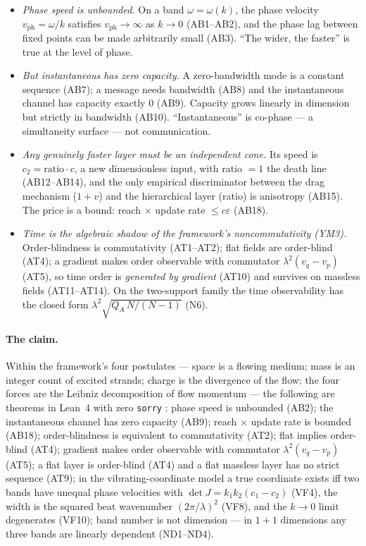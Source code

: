 \documentclass[aps,prd,preprint,superscriptaddress,amsmath,amssymb]{revtex4-2}
\begin{document}
\begin{itemize}
\item \emph{Phase speed is unbounded.}  On a band
$\omega=\omega(k)$, the phase velocity $v_{\mathrm{ph}}=\omega/k$
satisfies $v_{\mathrm{ph}}\to\infty$ as $k\to0$ (AB1--AB2), and the
phase lag between fixed points can be made arbitrarily small (AB3).
``The wider, the faster'' is true at the level of phase.
\item \emph{But instantaneous has zero capacity.}  A zero-bandwidth
mode is a constant sequence (AB7); a message needs bandwidth (AB8) and
the instantaneous channel has capacity exactly $0$ (AB9).  Capacity
grows linearly in dimension but strictly in bandwidth (AB10).
``Instantaneous'' is co-phase --- a simultaneity surface --- not
communication.
\item \emph{Any genuinely faster layer must be an independent
cone.}  Its speed is $c_2=\mathrm{ratio}\cdot c$, a new dimensionless
input, with ratio $=1$ the death line (AB12--AB14), and the only
empirical discriminator between the drag mechanism ($1+v$) and the
hierarchical layer (ratio) is anisotropy (AB15).  The price is a
bound: reach $\times$ update rate $\le c\varepsilon$ (AB18).
\item \emph{Time is the algebraic shadow of the framework's
noncommutativity (YM3).}  Order-blindness is commutativity (AT1--AT2);
flat fields are order-blind (AT4); a gradient makes order observable
with commutator $\lambda^2(v_q-v_p)$ (AT5), so time order is
\emph{generated by gradient} (AT10) and survives on massless fields
(AT11--AT14).  On the two-support family the time observability has
the closed form $\lambda^2\sqrt{Q_A\,N/(N-1)}$ (N6).
\end{itemize}

\paragraph{The claim.}
Within the framework's four postulates --- space is a flowing medium;
mass is an integer count of excited strands; charge is the divergence
of the flow; the four forces are the Leibniz decomposition of flow
momentum --- the following are theorems in Lean~4 with zero
\texttt{sorry} \cite{de2015lean,ProjectionPhysics}: phase speed is
unbounded (AB2); the instantaneous channel has zero capacity (AB9);
reach $\times$ update rate is bounded (AB18); order-blindness is
equivalent to commutativity (AT2); flat implies order-blind (AT4);
gradient makes order observable with commutator $\lambda^2(v_q-v_p)$
(AT5); a flat layer is order-blind (AT4) and a flat massless layer
has no strict sequence (AT9); in the vibrating-coordinate model a
true coordinate exists iff
two bands have unequal phase velocities with
$\det J=k_1k_2(c_1-c_2)$ (VF4), the width is the squared beat wavenumber $(2\pi/\lambda)^2$
(VF8), and the $k\to0$ limit degenerates (VF10);
band number is not dimension --- in $1+1$ dimensions any three bands
are linearly dependent (ND1--ND4).
\end{document}
